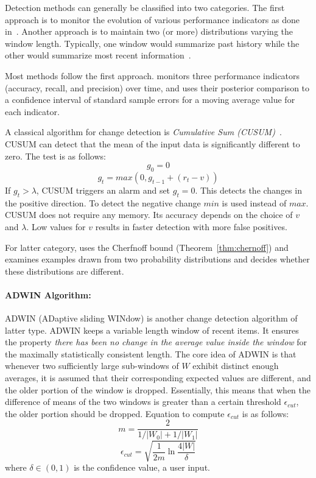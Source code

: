 Detection methods can generally be classified into two categories. The first approach is to monitor the evolution of various performance indicators as done in~\cite{klinkenberg98:changedetection, zeira04:changedetection}. Another approach is to maintain two (or more) distributions varying the window length. Typically, one window would summarize past history while the other would summarize most recent information~\cite{kifer04:condrift}.

Most methods follow the first approach. \cite{klinkenberg98:changedetection} monitors three performance indicators (accuracy, recall, and precision) over time, and uses their posterior comparison to a confidence interval of standard sample errors for a moving average value for each indicator.

A classical algorithm for change detection is \textit{Cumulative Sum (CUSUM)}~\cite{page54:cusum}. CUSUM can detect that the mean of the input data is significantly different to zero. The test is as follows:
\[
    g_0 = 0 
\]\[
    g_t = max (0, g_{t-1} + (r_t - v))
\]
If $g_t > \lambda$, CUSUM triggers an alarm and set $g_t = 0$. This detects the changes in the positive direction. To detect the negative change $min$ is used instead of $max$. CUSUM does not require any memory. Its accuracy depends on the choice of $v$ and $\lambda$. Low values for $v$ results in faster detection with more false positives.

For latter category, \cite{kifer04:condrift} uses the Cherfnoff bound (Theorem~\ref{thm:chernoff}) and examines examples drawn from two probability distributions and decides whether these distributions are different.

\paragraph{ADWIN Algorithm:} ADWIN (ADaptive sliding WINdow) is another change detection algorithm of latter type. ADWIN keeps a variable length window of recent items. It ensures the property {\it there has been no change in the average value inside the window} for the maximally statistically consistent length. The core idea of ADWIN is that whenever two sufficiently large sub-windows of $W$ exhibit distinct enough averages, it is assumed that their corresponding expected values are different, and the older portion of the window is dropped. Essentially, this means that when the difference of means of the two windows is greater than a certain threshold $\epsilon_{cut}$, the older portion should be dropped. Equation to compute $\epsilon_{cut}$ is as follows:
\[
    m = \frac{2}{1/|W_0| + 1/|W_1|}
\]\[
    \epsilon_{cut} = \sqrt{\frac{1}{2m} \ln \frac{4 |W|}{\delta}}
\]
where $\delta \in (0, 1)$ is the confidence value, a user input.

